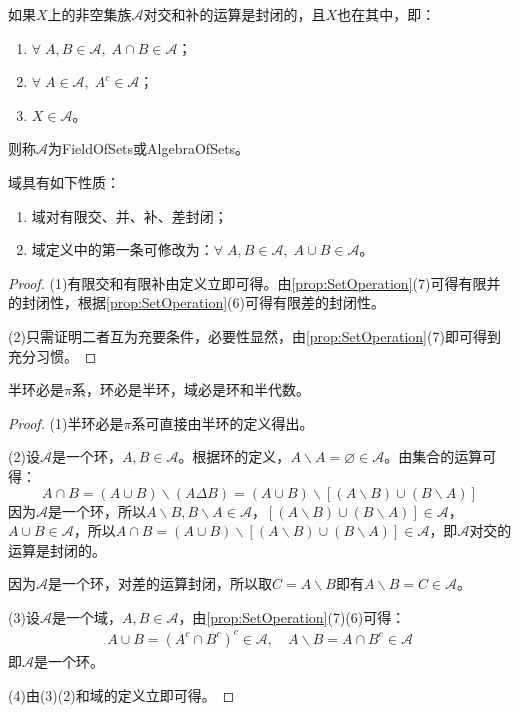 \begin{definition}
	如果$X$上的非空集族$\mathscr{A}$对交和补的运算是封闭的，且$X$也在其中，即：
	\begin{enumerate}
		\item $\forall\;A,B\in\mathscr{A},\;A\cap B\in\mathscr{A}$；
		\item $\forall\;A\in\mathscr{A},\;A^c\in\mathscr{A}$；
		\item $X\in\mathscr{A}$。
	\end{enumerate}
	则称$\mathscr{A}$为\gls{FieldOfSets}或\gls{AlgebraOfSets}。
\end{definition}
\begin{property}
	域具有如下性质：
	\begin{enumerate}
		\item 域对有限交、并、补、差封闭；
		\item 域定义中的第一条可修改为：$\forall\;A,B\in\mathscr{A},\;A\cup B\in\mathscr{A}$。
	\end{enumerate}
\end{property}
\begin{proof}
	(1)有限交和有限补由定义立即可得。由\cref{prop:SetOperation}(7)可得有限并的封闭性，根据\cref{prop:SetOperation}(6)可得有限差的封闭性。\par
	(2)只需证明二者互为充要条件，必要性显然，由\cref{prop:SetOperation}(7)即可得到充分习惯。
\end{proof}
\begin{theorem}\label{theo:SetNecessarilySet1}
	半环必是$\pi$系，环必是半环，域必是环和半代数。
\end{theorem}
\begin{proof}
	(1)半环必是$\pi$系可直接由半环的定义得出。\par
	(2)设$\mathscr{A}$是一个环，$A,B\in\mathscr{A}$。根据环的定义，$A\backslash A=\varnothing\in\mathscr{A}$。由集合的运算可得：
	\begin{equation*}
		A\cap B=(A\cup B)\backslash(A\Delta B)=(A\cup B)\backslash[(A\backslash B)\cup(B\backslash A)] 
	\end{equation*}
	因为$\mathscr{A}$是一个环，所以$A\backslash B,B\backslash A\in\mathscr{A}$，$[(A\backslash B)\cup(B\backslash A)]\in\mathscr{A}$，$A\cup B\in\mathscr{A}$，所以$A\cap B=(A\cup B)\backslash[(A\backslash B)\cup(B\backslash A)]\in\mathscr{A}$，即$\mathscr{A}$对交的运算是封闭的。\par
	因为$\mathscr{A}$是一个环，对差的运算封闭，所以取$C=A\backslash B$即有$A\backslash B=C\in\mathscr{A}$。\par
	(3)设$\mathscr{A}$是一个域，$A,B\in\mathscr{A}$，由\cref{prop:SetOperation}(7)(6)可得：
	\begin{gather*}
		A\cup B=(A^c\cap B^c)^c\in\mathscr{A},\quad A\backslash B=A\cap B^c\in\mathscr{A}
	\end{gather*}
	即$\mathscr{A}$是一个环。\par
	(4)由(3)(2)和域的定义立即可得。
\end{proof}
